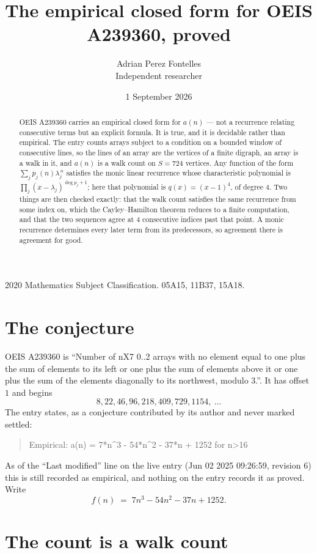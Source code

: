 \documentclass[11pt,a4paper]{article}
\title{The empirical closed form for OEIS A239360, proved}
\author{Adrian Perez Fontelles\\ \small Independent researcher}
\date{1 September 2026}
\theoremstyle{plain}
\theoremstyle{definition}
\begin{document}
\maketitle

\begin{abstract}
OEIS A239360 carries an empirical closed form for $a(n)$ --- not a recurrence relating
consecutive terms but an explicit formula. It is true, and it is decidable rather than
empirical. The entry counts arrays subject to a condition on a bounded window of consecutive lines, so the lines of an array are the
vertices of a finite digraph, an array is a walk in it, and $a(n)$ is a walk count on
$S=724$ vertices. Any function of the form $\sum_j p_j(n)\lambda_j^{\,n}$ satisfies the
monic linear recurrence whose characteristic polynomial is
$\prod_j(x-\lambda_j)^{\deg p_j+1}$; here that polynomial is $q(x)=(x-1)^{4}$, of degree
$4$. Two things are then checked exactly: that the walk count satisfies the same
recurrence from some index on, which the Cayley--Hamilton theorem reduces to a finite
computation, and that the two sequences agree at $4$ consecutive indices past that
point. A monic recurrence determines every later term from its predecessors, so agreement
there is agreement for good.
\end{abstract}

\noindent\small 2020 Mathematics Subject Classification. 05A15, 11B37, 15A18.\normalsize

\section{The conjecture}

OEIS A239360 is ``Number of nX7 0..2 arrays with no element equal to one plus the sum of elements to its left or one plus the sum of elements above it or one plus the sum of the elements diagonally to its northwest, modulo 3.''. It has offset $1$ and begins
\[
8, 22, 46, 96, 218, 409, 729, 1154,\ \dots
\]
The entry states, as a conjecture contributed by its author and never marked settled:
\begin{quote}
Empirical: a(n) = 7*n\^{}3 - 54*n\^{}2 - 37*n + 1252 for n>16
\end{quote}
As of the ``Last modified'' line on the live entry (Jun 02 2025 09:26:59, revision 6) this is still
recorded as empirical, and nothing on the entry records it as proved. Write
\[
f(n)\;=\;7 n^{3} - 54 n^{2} - 37 n + 1252.
\]

\section{The count is a walk count}
\end{document}
